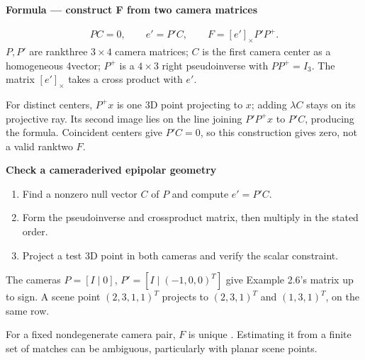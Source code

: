 \documentclass[letterpaper,11pt,english,openany,oneside]{jupyterBook}
\begin{document}
\begin{TextbookBox}
\textbf{Formula — construct F from two camera matrices}\par\smallskip
\begin{equation}\label{equation:lectures/lecture02/two-view:eq-lec02-fcamera}
\begin{split}PC=0,\qquad e'=P'C,\qquad
F=[e']_\times P'P^+.\end{split}
\end{equation}
\sphinxAtStartPar
\(P,P'\) are rank\sphinxhyphen{}three \(3\times4\) camera matrices; \(C\) is the first camera center as a homogeneous 4\sphinxhyphen{}vector; \(P^+\) is a \(4\times3\) right pseudoinverse with \(PP^+=I_3\). The matrix \([e']_\times\) takes a cross product with \(e'\).

\sphinxAtStartPar
For distinct centers, \(P^+x\) is one 3D point projecting to \(x\); adding \(\lambda C\) stays on its projective ray. Its second image lies on the line joining \(P'P^+x\) to \(P'C\), producing the formula. Coincident centers give \(P'C=0\), so this construction gives zero, not a valid rank\sphinxhyphen{}two \(F\).

\end{TextbookBox}

\begin{TextbookBox}
\textbf{Check a camera\sphinxhyphen{}derived epipolar geometry}\par\smallskip
\begin{enumerate}
%
\item {}
\sphinxAtStartPar
Find a nonzero null vector \(C\) of \(P\) and compute \(e'=P'C\).

\item {}
\sphinxAtStartPar
Form the pseudoinverse and cross\sphinxhyphen{}product matrix, then multiply in the stated order.

\item {}
\sphinxAtStartPar
Project a test 3D point in both cameras and verify the scalar constraint.

\end{enumerate}

\sphinxAtStartPar
The cameras \(P=[I\mid0]\), \(P'=[I\mid(-1,0,0)^T]\) give Example 2.6’s matrix up to sign. A scene point \((2,3,1,1)^T\) projects to \((2,3,1)^T\) and \((1,3,1)^T\), on the same row.

\end{TextbookBox}

\sphinxAtStartPar
For a fixed nondegenerate camera pair, \(F\) is unique . Estimating it from a finite set of matches can be ambiguous, particularly with planar scene points.
\end{document}
